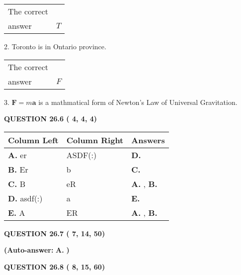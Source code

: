 \documentclass[12pt]{article}
\begin{document}
\noindent\begin{tabular}{|l|l|}\hline The correct & \\
          answer &  %
$T$ \\ \hline \end{tabular}
2.  %
Toronto is in  %
Ontario province.
 
\noindent\begin{tabular}{|l|l|}\hline The correct & \\
          answer &  %
$F$ \\ \hline \end{tabular}
3.  %
$\mathbf{F}=m\mathbf{a}$ is a mathmatical form of  %
Newton's Law of Universal Gravitation.
 
  
  
{\textbf{\large{QUESTION
26.6 
 (          4,          4,          4)
}}}
 
 
\noindent{}
  
  
\begin{tabular}{|l|l|l|}
 \hline
 Column Left & Column Right  & Answers       \\ 
 \hline
{\textbf{\large{
A.}}}
er
  & 
ASDF(:)
 & 
{\textbf{\large{
D.}}}
 \\ 
 \hline
{\textbf{\large{
B.}}}
Er
  & 
b
 & 
{\textbf{\large{
C.}}}
 \\ 
 \hline
{\textbf{\large{
C.}}}
B
  & 
eR
 & 
{\textbf{\large{
A.}}}
, 
{\textbf{\large{
B.}}}
 \\ 
 \hline
{\textbf{\large{
D.}}}
asdf(:)
  & 
a
 & 
{\textbf{\large{
E.}}}
 \\ 
 \hline
{\textbf{\large{
E.}}}
A
  & 
ER
 & 
{\textbf{\large{
A.}}}
, 
{\textbf{\large{
B.}}}
 \\ 
 \hline
 \end{tabular}
  
  
\noindent{}
 
 
  
  
{\textbf{\large{QUESTION
26.7 
 (          7,         14,         50)
}}}
 
 
{\textbf{(Auto-answer:}}
{\textbf{\large{
A.}}}
{\textbf{)}}
 
 
  
  
{\textbf{\large{QUESTION
26.8 
 (          8,         15,         60)
}}}
\end{document}
